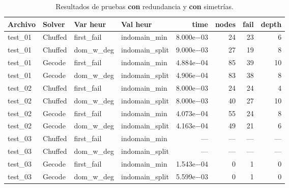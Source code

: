 \begin{compactfloats}
\begin{table}[H]
  \centering
  \small
  \setlength{\tabcolsep}{10.8pt}
  \caption{Resultados de pruebas \textbf{con} redundancia y \textbf{con} simetrías.}
  \label{tab:pruebas-rectangulo-red-sym}
  \begin{tabular}{l l l l r r r r}
    \toprule
    \textbf{Archivo} & \textbf{Solver} & \textbf{Var heur} & \textbf{Val heur} & \textbf{time} & \textbf{nodes} & \textbf{fail} & \textbf{depth} \\
    \midrule
    test\_01 & Chuffed & first\_fail  & indomain\_min   & 8.000e$-$03 & 24 & 23 & 6 \\
    test\_01 & Chuffed & dom\_w\_deg  & indomain\_split & 9.000e$-$03 & 27 & 19 & 8 \\
    test\_01 & Gecode  & first\_fail  & indomain\_min   & 4.884e$-$04 & 85 & 39 & 10 \\
    test\_01 & Gecode  & dom\_w\_deg  & indomain\_split & 4.906e$-$04 & 83 & 38 & 8 \\
    \midrule
    test\_02 & Chuffed & first\_fail  & indomain\_min   & 8.000e$-$03 & 24 & 24 & 4 \\
    test\_02 & Chuffed & dom\_w\_deg  & indomain\_split & 8.000e$-$03 & 40 & 27 & 10 \\
    test\_02 & Gecode  & first\_fail  & indomain\_min   & 4.073e$-$04 & 55 & 24 & 8 \\
    test\_02 & Gecode  & dom\_w\_deg  & indomain\_split & 4.163e$-$04 & 49 & 21 & 6 \\
    \midrule
    test\_03 & Chuffed & first\_fail  & indomain\_min   & --- & --- & --- & --- \\
    test\_03 & Chuffed & dom\_w\_deg  & indomain\_split & --- & --- & --- & --- \\
    test\_03 & Gecode  & first\_fail  & indomain\_min   & 1.543e$-$04 & 0 & 1 & 0 \\
    test\_03 & Gecode  & dom\_w\_deg  & indomain\_split & 5.599e$-$03 & 0 & 1 & 0 \\
    \bottomrule
  \end{tabular}
\end{table}
\end{compactfloats}

\FloatBarrier

